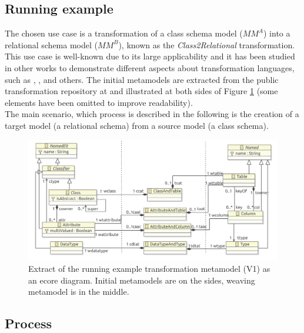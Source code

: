 \documentclass{llncs}
\begin{document}
\subsection{Running example}
%
The chosen use case is a transformation of a class schema
model ($MM^A$) into a relational schema model ($MM^B$), known as the
\textit{Class2Relational} transformation. This use case is well-known due to its
large applicability and it has been studied in other works to demonstrate
different aspects about transformation languages, such as 
\cite{QVT}, \cite{tefkat}, and others. The initial metamodels are
extracted from the public transformation repository at \cite{atlc2r} and illustrated at both sides of Figure
\ref{fig:classAndRelational} (some elements have been omitted to improve readability).\\
The main scenario, which process is described in the following is the creation of a target model (a relational schema) from a source model (a class schema).
%
\begin{figure}[htb] \centering \includegraphics[scale=0.6]{img/CLAR-transformation-metamodel-v1.pdf}
\caption{Extract of the running example transformation metamodel (V1) as an ecore diagram. Initial metamodels are on the sides, weaving metamodel is in the middle.}
\label{fig:classAndRelational}
\end{figure}
%
\subsection{Process}
%
\end{document}
